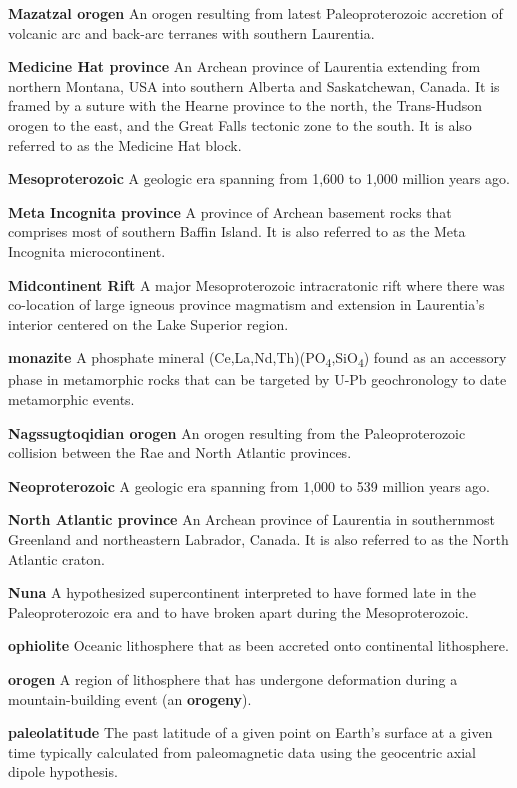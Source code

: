 \documentclass[twocolumn, switch]{article} %
\begin{document}
\noindent\textbf{Mazatzal orogen } An orogen resulting from latest Paleoproterozoic accretion of volcanic arc and back-arc terranes with southern Laurentia.

\noindent\textbf{Medicine Hat province } An Archean province of Laurentia extending from northern Montana, USA into southern Alberta and Saskatchewan, Canada. It is framed by a suture with the Hearne province to the north, the Trans-Hudson orogen to the east, and the Great Falls tectonic zone to the south. It is also referred to as the Medicine Hat block.

\noindent\textbf{Mesoproterozoic } A geologic era spanning from 1,600 to 1,000 million years ago.

\noindent\textbf{Meta Incognita province } A province of Archean basement rocks that comprises most of southern Baffin Island. It is also referred to as the Meta Incognita microcontinent.

\noindent\textbf{Midcontinent Rift } A major Mesoproterozoic intracratonic rift where there was co-location of large igneous province magmatism and extension in Laurentia's interior centered on the Lake Superior region.

\noindent\textbf{monazite } A phosphate mineral (Ce,La,Nd,Th)(PO\textsubscript{4},SiO\textsubscript{4}) found as an accessory phase in metamorphic rocks that can be targeted by U-Pb geochronology to date metamorphic events.

\noindent\textbf{Nagssugtoqidian orogen } An orogen resulting from the Paleoproterozoic collision between the Rae and North Atlantic provinces.

\noindent\textbf{Neoproterozoic } A geologic era spanning from 1,000 to 539 million years ago.

\noindent\textbf{North Atlantic province } An Archean province of Laurentia in southernmost Greenland and northeastern Labrador, Canada. It is also referred to as the North Atlantic craton.

\noindent\textbf{Nuna } A hypothesized supercontinent interpreted to have formed late in the Paleoproterozoic era and to have broken apart during the Mesoproterozoic.

\noindent\textbf{ophiolite } Oceanic lithosphere that as been accreted onto continental lithosphere.

\noindent\textbf{orogen } A region of lithosphere that has undergone deformation during a mountain-building event (an \textbf{orogeny}).

\noindent\textbf{paleolatitude } The past latitude of a given point on Earth's surface at a given time typically calculated from paleomagnetic data using the geocentric axial dipole hypothesis.
\end{document}
